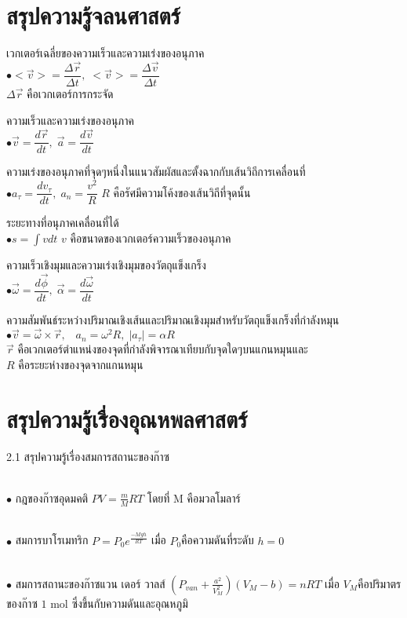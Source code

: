 \documentclass[a4paper,12pt]{article}
\begin{document}
	
	\section*{สรุปความรู้จลนศาสตร์}
เวกเตอร์เฉลี่ยของความเร็วและความเร่งของอนุภาค
~\\ $\bullet <\vec{v}> = \dfrac{\Delta \vec r}{\Delta t},\; <\vec{v}>= \dfrac{\Delta \vec v}{\Delta t}$~\\
$\Delta \vec r$ คือเวกเตอร์การกระจัด

ความเร็วและความเร่งของอนุภาค
~\\ $\bullet \vec v = \dfrac{d\vec r}{dt}, \; \vec a = \dfrac{d\vec v}{dt}$

ความเร่งของอนุภาคที่จุดๆหนึ่งในแนวสัมผัสและตั้งฉากกับเส้นวิถีการเคลื่อนที่ ~\\ $\bullet a_\tau = \dfrac{dv_\tau}{dt}, \; a_n = \dfrac{v^2}{R}$
$R$ คือรัศมีความโค้งของเส้นวิถีที่จุดนั้น


ระยะทางที่อนุภาคเคลื่อนที่ได้ ~\\ $\bullet s = \int v dt$ 
$v$ คือขนาดของเวกเตอร์ความเร็วของอนุภาค

 ความเร็วเชิงมุมและความเร่งเชิงมุมของวัตถุแข็งเกร็ง~\\ 
$\bullet \vec \omega = \dfrac{d\vec \phi}{dt}, \; \vec \alpha = \dfrac{d\vec \omega}{dt}$

ความสัมพันธ์ระหว่างปริมาณเชิงเส้นและปริมาณเชิงมุมสำหรับวัตถุแข็งเกร็งที่กำลังหมุน~\\ 
$\bullet \vec v = \vec \omega \times \vec r, \;\;\; a_n = \omega ^2 R, \; |a_\tau| = \alpha R$\\
\indent $\vec r$ คือเวกเตอร์ตำแหน่งของจุดที่กำลังพิจารณาเทียบกับจุดใดๆบนแกนหมุนและ\\
\indent $R$ คือระยะห่างของจุดจากแกนหมุน

\pagebreak

	\section*{สรุปความรู้เรื่องอุณหพลศาสตร์}
2.1 สรุปความรู้เรื่องสมการสถานะของก๊าซ

~\\
$\bullet$  กฎของก๊าซอุดมคติ
$\displaystyle PV=\frac{m}{M}RT$
โดยที่ M คือมวลโมลาร์

~\\ $\bullet$  สมการบาโรเมทริก
$\displaystyle P=P_0e^{\frac{-Mgh}{RT}}$
เมื่อ $P_0$คือความดันที่ระดับ $h=0$

~\\ $\bullet$ สมการสถานะของก๊าซแวน เดอร์ วาลส์
$\displaystyle(P_{van}+\frac{a^2}{V_M^2})(V_M-b)=nRT$
เมื่อ $V_M$คือปริมาตรของก๊าซ $1 \mbox{ mol}$ ซึ่งขึ้นกับความดันและอุณหภูมิ
\end{document}
